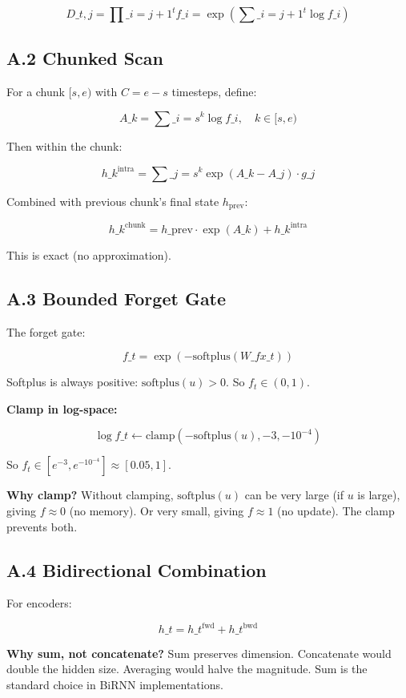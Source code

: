 \[
D\_{t, j} = \prod\_{i=j+1}^{t} f\_i = \exp\left(\sum\_{i=j+1}^{t} \log f\_i\right)
\tag{A.3}
\]

\subsection{A.2 Chunked Scan}

For a chunk $[s, e)$ with $C = e - s$ timesteps, define:

\[
A\_k = \sum\_{i=s}^{k} \log f\_i, \quad k \in [s, e)
\tag{A.4}
\]

Then within the chunk:

\[
h\_k^\text{intra} = \sum\_{j=s}^{k} \exp(A\_k - A\_j) \cdot g\_j
\tag{A.5}
\]

Combined with previous chunk's final state $h_\text{prev}$:

\[
h\_k^\text{chunk} = h\_\text{prev} \cdot \exp(A\_k) + h\_k^\text{intra}
\tag{A.6}
\]

This is exact (no approximation).

\subsection{A.3 Bounded Forget Gate}

The forget gate:

\[
f\_t = \exp(-\text{softplus}(W\_f x\_t))
\tag{A.7}
\]

Softplus is always positive: $\text{softplus}(u) > 0$. So $f_t \in (0, 1)$.

\textbf{Clamp in log-space:}

\[
\log f\_t \leftarrow \text{clamp}(- \text{softplus}(u), -3, -10^{-4})
\tag{A.8}
\]

So $f_t \in [e^{-3}, e^{-10^{-4}}] \approx [0.05, 1]$.

\textbf{Why clamp?} Without clamping, $\text{softplus}(u)$ can be very large (if 
$u$ is large), giving $f \approx 0$ (no memory). Or very small, giving 
$f \approx 1$ (no update). The clamp prevents both.

\subsection{A.4 Bidirectional Combination}

For encoders:

\[
h\_t = h\_t^\text{fwd} + h\_t^\text{bwd}
\tag{A.9}
\]

\textbf{Why sum, not concatenate?} Sum preserves dimension. Concatenate would 
double the hidden size. Averaging would halve the magnitude. Sum is the 
standard choice in BiRNN implementations.

